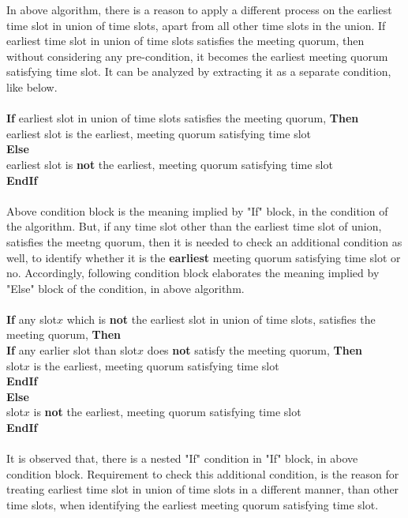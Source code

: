 \documentclass{article}
\begin{document}
In above algorithm, there is a reason to apply a different process on the earliest time slot in union of time slots, apart from all other time slots in the union. If earliest time slot in union of time slots satisfies the meeting quorum, then without considering any pre-condition, it becomes the earliest meeting quorum satisfying time slot. It can be analyzed by extracting it as a separate condition, like below. \\ \\
\textbf{If} earliest slot in union of time slots satisfies the meeting quorum, \textbf{Then} \\
\indent earliest slot is the earliest, meeting quorum satisfying time slot \\
\textbf{Else}\\
\indent earliest slot is \textbf{not} the earliest, meeting quorum satisfying time slot \\
\textbf{EndIf}  \\ \\
Above condition block is the meaning implied by "If" block, in the condition of the algorithm. But, if any time slot other than the earliest time slot of union, satisfies the meetng quorum, then it is needed to check an additional condition as well, to identify whether it is the \textbf{earliest} meeting quorum satisfying time slot or no. Accordingly, following condition block elaborates the meaning implied by "Else" block of the condition, in above algorithm. \\ \\             
\textbf{If} any slot$x$ which is \textbf{not} the earliest slot in union of time slots, satisfies the meeting quorum, \textbf{Then} \\
\indent \textbf{If} any earlier slot than slot$x$ does \textbf{not} satisfy the meeting quorum, \textbf{Then} \\
\indent \indent slot$x$ is the earliest, meeting quorum satisfying time slot \\
\indent \textbf{EndIf}\\
\textbf{Else}\\
\indent slot$x$ is \textbf{not} the earliest, meeting quorum satisfying time slot \\
\textbf{EndIf}  \\ \\
It is observed that, there is a nested "If" condition in "If" block, in above condition block. Requirement to check this additional condition, is the reason for treating earliest time slot in union of time slots in a different manner, than other time slots, when identifying the earliest meeting quorum satisfying time slot.\\ \\
\end{document}
